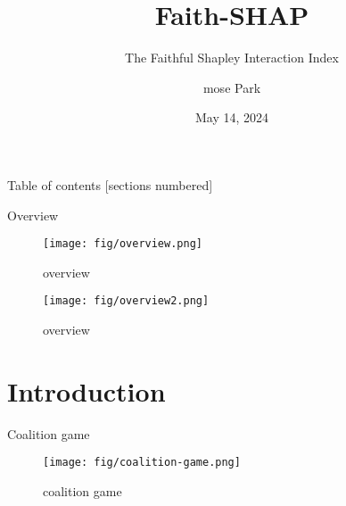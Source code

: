 \documentclass[10pt]{beamer}
\title{Faith-SHAP}
\subtitle{The Faithful Shapley Interaction Index}
\date{May 14, 2024}
\author{mose Park}
\institute{Department of Statistical Data Science \\
    University of Seoul}
\newcommand{\g}{g}
\def\Expl{\mathcal{E}}
\begin{document}
\maketitle

\begin{frame}{Table of contents}
  [sections numbered]
  \tableofcontents%
\end{frame}

\begin{frame}{Overview}
    \begin{figure}[h]
    \centering
    \texttt{[image: fig/overview.png]}
    \caption{overview}
    \end{figure}
\end{frame}
\begin{frame}
    \begin{figure}[h]
    \centering
    \texttt{[image: fig/overview2.png]}
    \caption{overview}
    \end{figure}
\end{frame}


\section[Intro]{Introduction}


\begin{frame}{Coalition game}

\begin{figure}[h]
\centering
\texttt{[image: fig/coalition-game.png]}
\caption{coalition game}
\label{fig:coalition-game}
\end{figure}
  
\end{frame}


\def\model{f}
\def\X{\mathcal{X}}
\def\R{\mathbb{R}}
\def\g{g}
\def\Expl{\mathcal{E}}
\end{document}
